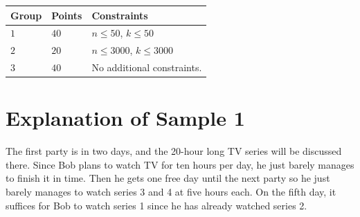 \noindent
\begin{tabular}{| l | l | p{12cm} |}
  \hline
  \textbf{Group} & \textbf{Points} & \textbf{Constraints} \\ \hline
    $1$   & $40$     & $n \leq 50$, $k \leq 50$ \\ \hline
    $2$   & $20$     & $n \leq 3000$, $k \leq 3000$ \\ \hline
    $3$   & $40$     & No additional constraints. \\ \hline
\end{tabular}


\section*{Explanation of Sample 1}
The first party is in two days, and the 20-hour long TV series will be discussed there. Since Bob plans to watch TV for ten hours per day, he just barely manages to finish it in time. Then he gets one free day until the next party so he just barely manages to watch series 3 and 4 at five hours each. On the fifth day, it suffices for Bob to watch series 1 since he has already watched series 2.
